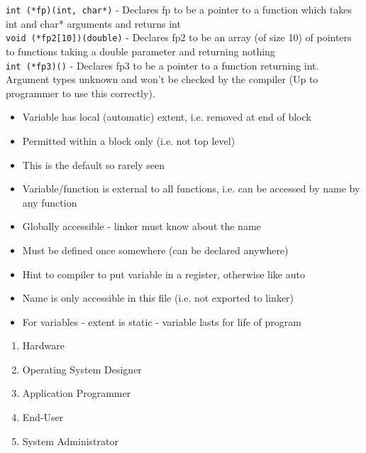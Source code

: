 \documentclass[number]{notes}
\begin{document}
\tableofcontents\newpage
\begin{landscape}
\headfoot
\begin{multicols}{3}

\texttt{int (*fp)(int, char*)} - Declares fp to be a pointer to a function which takes int and char* arguments and returns int\\
\texttt{void (*fp2[10])(double)} - Declares fp2 to be an array (of size 10) of pointers to functions taking a double parameter and returning nothing\\
\texttt{int (*fp3)()} - Declares fp3 to be a pointer to a function returning int. Argument types unknown and won't be checked by the compiler (Up to programmer to use this correctly).

\begin{itemize}[nolistsep]
    \item Variable has local (automatic) extent, i.e. removed at end of block
    \item Permitted within a block only (i.e. not top level)
    \item This is the default so rarely seen
\end{itemize}
\begin{itemize}[nolistsep]
    \item Variable/function is external to all functions, i.e. can be accessed by name by any function
    \item Globally accessible - linker must know about the name
    \item Must be defined once somewhere (can be declared anywhere)
\end{itemize}
\begin{itemize}[nolistsep]
    \item Hint to compiler to put variable in a register, otherwise like auto
\end{itemize}
\begin{itemize}[nolistsep]
    \item Name is only accessible in this file (i.e. not exported to linker)
    \item For variables - extent is static - variable lasts for life of program
\end{itemize}

\begin{enumerate}[nolistsep]
    \item Hardware
    \item Operating System Designer
    \item Application Programmer
    \item End-User
    \item System Administrator
\end{enumerate}


\end{multicols}
\end{landscape}
\end{document}
